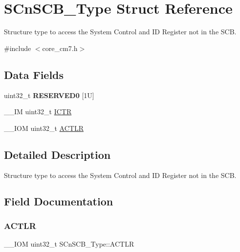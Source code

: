 \hypertarget{structSCnSCB__Type}{}\section{S\+Cn\+S\+C\+B\+\_\+\+Type Struct Reference}
\label{structSCnSCB__Type}


Structure type to access the System Control and ID Register not in the S\+CB.  




{\ttfamily \#include $<$core\+\_\+cm7.\+h$>$}

\subsection*{Data Fields}
\begin{DoxyCompactItemize}
\item 
\mbox{\label{structSCnSCB__Type_af75fb31df4666b9dfc611c2546e35ac6}} 
uint32\+\_\+t {\bfseries R\+E\+S\+E\+R\+V\+E\+D0} \mbox{[}1\+U\mbox{]}
\item 
\+\_\+\+\_\+\+IM uint32\+\_\+t \mbox{\hyperlink{structSCnSCB__Type_a34ec1d771245eb9bd0e3ec9336949762}{I\+C\+TR}}
\item 
\+\_\+\+\_\+\+I\+OM uint32\+\_\+t \mbox{\hyperlink{structSCnSCB__Type_a13af9b718dde7481f1c0344f00593c23}{A\+C\+T\+LR}}
\end{DoxyCompactItemize}


\subsection{Detailed Description}
Structure type to access the System Control and ID Register not in the S\+CB. 

\subsection{Field Documentation}
\mbox{\label{structSCnSCB__Type_a13af9b718dde7481f1c0344f00593c23}} 
\subsubsection{\texorpdfstring{ACTLR}{ACTLR}}
{\footnotesize\ttfamily \+\_\+\+\_\+\+I\+OM uint32\+\_\+t S\+Cn\+S\+C\+B\+\_\+\+Type\+::\+A\+C\+T\+LR}

